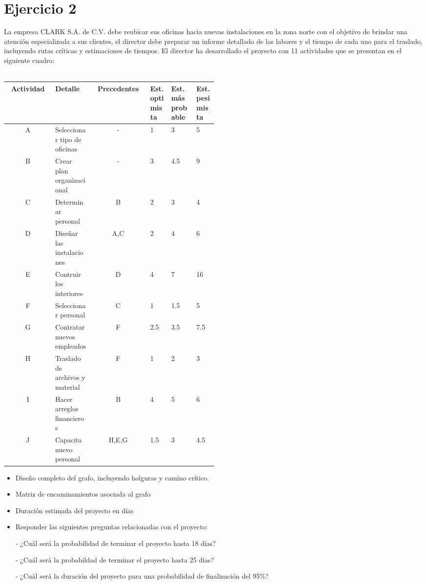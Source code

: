 \documentclass[12pt]{article}
\begin{document}
\section{Ejercicio 2}

La empresa CLARK S.A. de C.V. debe reubicar sus oficinas hacia nuevas
instalaciones en la zona norte con el objetivo de brindar una atención
especializada a sus clientes, el director debe preparar un informe detallado de
las labores y el tiempo de cada uno para el traslado, incluyendo rutas críticas
y estimaciones de tiempos. El director ha desarrollado el proyecto con 11
actividades que se presentan en el siguiente cuadro: \\
\\

\begin{tabular}{cp{0.18\linewidth}cp{0.1\linewidth}p{0.12\linewidth}p{0.1\linewidth}}
Actividad   &    Detalle    &   Precedentes & Est. optimista  & Est.
más probable    &   Est. pesimista    \\
\hline
  A  & Seleccionar tipo de oficinas & -      &  1    &  3   &  5  \\
  B  & Crear plan organizacional    & -      &  3    &  4.5 &  9  \\ 
  C  & Determinar personal          & B      &  2    &  3   &  4  \\ 
  D  & Diseñar las instalaciones    & A,C    &  2    &  4   &  6  \\ 
  E  & Contruir los interiores      & D      &  4    &  7   &  16 \\
  F  & Seleccionar personal         & C      &  1    &  1.5 &  5  \\
  G  & Contratar nuevos empleados   & F      &  2.5  &  3.5 &  7.5\\
  H  & Traslado de archivos y material & F      &  1    &  2   &  3  \\
  I  & Hacer arreglos financieros   & B      &  4    &  5   &  6  \\
  J  & Capacita nuevo personal      & H,E,G  &  1.5  &  3   &  4.5
\end{tabular}


\begin{itemize}
    \item Diseño completo del grafo, incluyendo holguras y camino crítico.
    \item Matriz de encaminamientos asociada al grafo
    \item Duración estimada del proyecto en días
    \item Responder las siguientes preguntas relacionadas con el proyecto:

    - ¿Cuál será la probabilidad de terminar el proyecto hasta 18 días?

    - ¿Cuál será la probabildad de terminar el proyecto hasta 25 días?

- ¿Cuál será la duración del proyecto para una probabilidad de finalización del
95\%?
    
\end{itemize}
\end{document}
